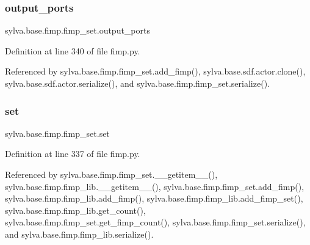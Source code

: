 \mbox{\label{classsylva_1_1base_1_1fimp_1_1fimp__set_ad27b4cf66a761b4ad12a2d490be1781c}} 
\subsubsection{\texorpdfstring{output\+\_\+ports}{output\_ports}}
{\footnotesize\ttfamily sylva.\+base.\+fimp.\+fimp\+\_\+set.\+output\+\_\+ports}



Definition at line 340 of file fimp.\+py.



Referenced by sylva.\+base.\+fimp.\+fimp\+\_\+set.\+add\+\_\+fimp(), sylva.\+base.\+sdf.\+actor.\+clone(), sylva.\+base.\+sdf.\+actor.\+serialize(), and sylva.\+base.\+fimp.\+fimp\+\_\+set.\+serialize().

\mbox{\label{classsylva_1_1base_1_1fimp_1_1fimp__set_ae1110f70c9087b003ef54d99f6eb8a83}} 
\subsubsection{\texorpdfstring{set}{set}}
{\footnotesize\ttfamily sylva.\+base.\+fimp.\+fimp\+\_\+set.\+set}



Definition at line 337 of file fimp.\+py.



Referenced by sylva.\+base.\+fimp.\+fimp\+\_\+set.\+\_\+\+\_\+getitem\+\_\+\+\_\+(), sylva.\+base.\+fimp.\+fimp\+\_\+lib.\+\_\+\+\_\+getitem\+\_\+\+\_\+(), sylva.\+base.\+fimp.\+fimp\+\_\+set.\+add\+\_\+fimp(), sylva.\+base.\+fimp.\+fimp\+\_\+lib.\+add\+\_\+fimp(), sylva.\+base.\+fimp.\+fimp\+\_\+lib.\+add\+\_\+fimp\+\_\+set(), sylva.\+base.\+fimp.\+fimp\+\_\+lib.\+get\+\_\+count(), sylva.\+base.\+fimp.\+fimp\+\_\+set.\+get\+\_\+fimp\+\_\+count(), sylva.\+base.\+fimp.\+fimp\+\_\+set.\+serialize(), and sylva.\+base.\+fimp.\+fimp\+\_\+lib.\+serialize().



